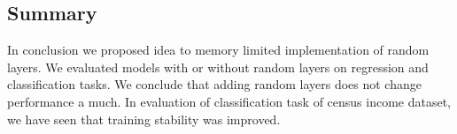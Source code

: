 \documentclass[]{article}
\begin{document}
\begin{multicols}{2}
	\section{Summary}
	In conclusion we proposed idea to memory limited implementation of random layers. We evaluated models with or without random layers on regression and classification tasks. We conclude that adding random layers does not change performance a much. In evaluation of classification task of census income dataset, we have seen that training stability was improved.
	
	
	
\end{multicols}
\end{document}
